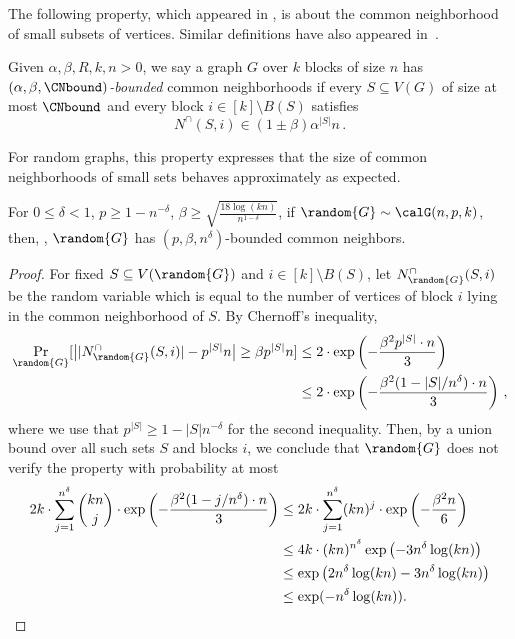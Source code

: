 The following property, which appeared in \cite{dRPR23UnarySA}, is about the common neighborhood of small subsets of vertices. Similar definitions have also appeared in~\cite{BIS07IndependentSets, BGL13ParameterizedDPLL, ABdRLNR21Clique}.
\begin{definition}\label{def:common-neighbor}
    Given $\alpha,\beta,R, k,n > 0$, 
    we say a graph $G$ over $k$ blocks of size $n$ has \emph{$(\alpha,\beta,\CNbound)$-bounded} common neighborhoods if every $S\subseteq V(G)$ of size at most $\CNbound$ and every block $i \in [k]\setminus B(S)$ satisfies
    $$N^\cap(S,i)\in (1\pm \beta)\alpha^{|S|}n\,.$$
\end{definition}

For random graphs, this property expresses that the size of common neighborhoods of small sets behaves approximately as expected.

\begin{lemma}
    \label{lemma:neigbor-concentrates}
    For $0\leq\delta <1$, $p\geq 1- n^{-\delta}$, $\beta \geq \sqrt{\frac{18\log(kn)}{n^{1-\delta}}}$, if $\random{G} \sim  \calG(n,p,k)$, then, \aas, $\random{G}$ has $(p,\beta,n^\delta)$-bounded common neighbors.
\end{lemma}

{}{
\begin{proof}
For fixed 
$S \subseteq  V(\random{G})$
and $i \in [k]\setminus B(S)$, let $N_{\random{G}}^\cap(S,i)$ be the random variable which is equal to the number of vertices of block $i$ lying in the common neighborhood of $S$. By Chernoff's inequality,
\begin{align*}
    \Pr_{\random{G}}[\big\lvert\lvert {N_{\random{G}}^\cap(S,i)}\rvert - p^{|S|}n\big \rvert \geq \beta p^{|S|}n]
    &\leq 2\cdot \exp\left ( -\frac{\beta^2p^{|S|} \cdot n}{3}\right)\\
    & \leq 2\cdot \exp\left ( -\frac{\beta^2(1-|S|/n^\delta) \cdot n}{3}\right)\,,
\end{align*}
where we use that $p^{|S|} \geq 1-|S|n^{-\delta}$ for the second inequality. Then, by a union bound over all such sets $S$ and blocks $i$, we conclude that $\random{G}$ does not verify the property with probability at most
\begin{align*}
    2k\cdot \sum_{j=1}^{n^\delta} 
    \binom{kn}{j}\cdot 
    \exp\left ( 
    -\frac{\beta^2(1-j/n^\delta) \cdot n}{3}
    \right) &\leq 2k\cdot \sum_{j=1}^{n^\delta} (kn)^j\cdot 
    \exp\left ( -\frac{\beta^2 n}{6}\right)\\
    & \leq 4k \cdot (kn)^{n^\delta}
    \exp\left( -3n^{\delta} \log (kn) \right) \\
    & \leq 
    \exp\left( 2n^{\delta} \log (kn)-3n^{\delta} \log (kn) \right) \\
    &\leq \exp(-n^{\delta} \log (kn)) . \qedhere
\end{align*}
\end{proof}
}


